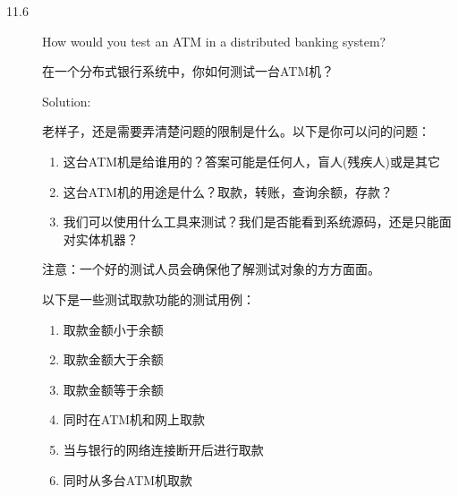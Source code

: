 \begin{description}
%


\item[11.6] How would you test an ATM in a distributed banking system?

在一个分布式银行系统中，你如何测试一台ATM机？

Solution: 

老样子，还是需要弄清楚问题的限制是什么。以下是你可以问的问题：
\begin{enumerate}
    \itemsep=-3pt
\item 这台ATM机是给谁用的？答案可能是任何人，盲人(残疾人)或是其它
\item 这台ATM机的用途是什么？取款，转账，查询余额，存款？
\item 我们可以使用什么工具来测试？我们是否能看到系统源码，还是只能面对实体机器？
\end{enumerate}
注意：一个好的测试人员会确保他了解测试对象的方方面面。

以下是一些测试取款功能的测试用例：
\begin{enumerate}
    \itemsep=-3pt
\item 取款金额小于余额
\item 取款金额大于余额
\item 取款金额等于余额
\item 同时在ATM机和网上取款
\item 当与银行的网络连接断开后进行取款
\item 同时从多台ATM机取款
\end{enumerate}
%

\end{description}
